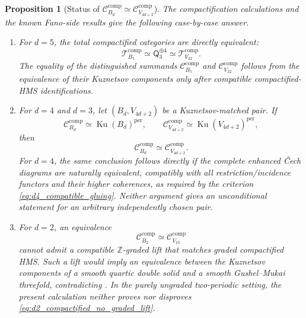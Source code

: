 \documentclass[11pt]{amsart}
\newtheorem{proposition}[theorem]{Proposition}
\theoremstyle{definition}
\theoremstyle{remark}
\newcommand{\MorseCat}[1]{\mathsf{Q}_{#1}}
\begin{document}
\begin{proposition}[Status of
$\mathcal C_{B_d}^{\mathrm{comp}}\simeq
\mathcal C_{V_{4d+2}}^{\mathrm{comp}}$]
\label{prop:case_by_case_compactified_equality}
The compactification calculations and the known Fano-side results give the
following case-by-case answer.
\begin{enumerate}[label=\textup{(\roman*)}]
\item For $d=5$, the total compactified categories are directly equivalent:
\begin{equation}
\label{eq:d5_total_compactified_equality}
\mathcal T_{B_5}^{\mathrm{comp}}
\simeq
\MorseCat{3}^{\oplus4}
\simeq
\mathcal T_{V_{22}}^{\mathrm{comp}}.
\end{equation}
The equality of the distinguished summands
$\mathcal C_{B_5}^{\mathrm{comp}}$ and
$\mathcal C_{V_{22}}^{\mathrm{comp}}$ follows from the equivalence of their
Kuznetsov components only after compatible compactified-HMS identifications.

\item For $d=4$ and $d=3$, let $(B_d,V_{4d+2})$ be a Kuznetsov-matched pair.
If
\[
\mathcal C_{B_d}^{\mathrm{comp}}
\simeq\operatorname{Ku}(B_d)^{\mathrm{per}},
\qquad
\mathcal C_{V_{4d+2}}^{\mathrm{comp}}
\simeq\operatorname{Ku}(V_{4d+2})^{\mathrm{per}},
\]
then
\begin{equation}
\label{eq:d3_d4_conditional_compactified_equality}
\mathcal C_{B_d}^{\mathrm{comp}}
\simeq
\mathcal C_{V_{4d+2}}^{\mathrm{comp}}.
\end{equation}
For $d=4$, the same conclusion follows directly if the complete enhanced
Čech diagrams are naturally equivalent, compatibly with all
restriction/incidence functors and their higher coherences, as required by
the criterion \eqref{eq:d4_compatible_gluing}.  Neither argument gives an
unconditional statement for an arbitrary independently chosen pair.

\item For $d=2$, an equivalence
\begin{equation}
\label{eq:d2_compactified_no_graded_lift}
\mathcal C_{B_2}^{\mathrm{comp}}
\simeq
\mathcal C_{V_{10}}^{\mathrm{comp}}
\end{equation}
cannot admit a compatible $\mathbb Z$-graded lift that matches graded
compactified HMS.  Such a lift would imply an equivalence between the
Kuznetsov components of a smooth quartic double solid and a smooth
Gushel--Mukai threefold, contradicting \cite{BayerPerry}.  In the purely
ungraded two-periodic setting, the present calculation neither proves nor
disproves \eqref{eq:d2_compactified_no_graded_lift}.


\end{enumerate}
\end{proposition}
\end{document}
